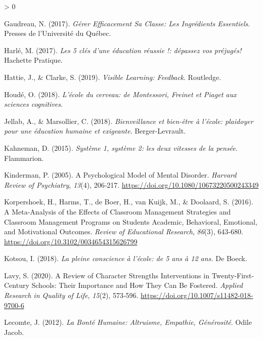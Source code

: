 \documentclass[
  french,
]{article}
\newlength{\cslhangindent}
\newenvironment{CSLReferences}[2] %
 {%
  \setlength{\parindent}{0pt}
  \ifodd #1 \everypar{\setlength{\hangindent}{\cslhangindent}}\ignorespaces\fi
  \ifnum #2 > 0
  \setlength{\parskip}{#2\baselineskip}
  \fi
 }%
 {}
\begin{document}
\begin{CSLReferences}{1}{0}
\leavevmode\hypertarget{ref-gaudreau2017}{}%
Gaudreau, N. (2017). \emph{Gérer Efficacement Sa Classe: Les Ingrédients Essentiels}. {Presses de l'Université du Québec}.

\leavevmode\hypertarget{ref-harle2017}{}%
Harlé, M. (2017). \emph{{Les 5 clés d'une éducation réussie !: dépassez vos préjugés!}} {Hachette Pratique}.

\leavevmode\hypertarget{ref-hattie2019}{}%
Hattie, J., \& Clarke, S. (2019). \emph{Visible Learning: Feedback}. {Routledge}.

\leavevmode\hypertarget{ref-houde2018a}{}%
Houdé, O. (2018). \emph{{L'école du cerveau: de Montessori, Freinet et Piaget aux sciences cognitives}}.

\leavevmode\hypertarget{ref-jellab2018}{}%
Jellab, A., \& Marsollier, C. (2018). \emph{{Bienveillance et bien-être à l'école: plaidoyer pour une éducation humaine et exigeante}}. {Berger-Levrault}.

\leavevmode\hypertarget{ref-kahneman2015}{}%
Kahneman, D. (2015). \emph{{Système 1, système 2: les deux vitesses de la pensée}}. {Flammarion}.

\leavevmode\hypertarget{ref-kinderman2005}{}%
Kinderman, P. (2005). A Psychological Model of Mental Disorder. \emph{Harvard Review of Psychiatry}, \emph{13}(4), 206‑217. \url{https://doi.org/10.1080/10673220500243349}

\leavevmode\hypertarget{ref-korpershoek2016}{}%
Korpershoek, H., Harms, T., de Boer, H., van Kuijk, M., \& Doolaard, S. (2016). A {Meta}-{Analysis} of the {Effects} of {Classroom Management Strategies} and {Classroom Management Programs} on {Students Academic}, {Behavioral}, {Emotional}, and {Motivational Outcomes}. \emph{Review of Educational Research}, \emph{86}(3), 643‑680. \url{https://doi.org/10.3102/0034654315626799}

\leavevmode\hypertarget{ref-kotsou2018}{}%
Kotsou, I. (2018). \emph{{La pleine conscience à l'école: de 5 ans à 12 ans.}} {De Boeck}.

\leavevmode\hypertarget{ref-lavy2020}{}%
Lavy, S. (2020). A {Review} of {Character Strengths Interventions} in {Twenty}-{First}-{Century Schools}: Their {Importance} and {How} They Can Be {Fostered}. \emph{Applied Research in Quality of Life}, \emph{15}(2), 573‑596. \url{https://doi.org/10.1007/s11482-018-9700-6}

\leavevmode\hypertarget{ref-lecomte2012c}{}%
Lecomte, J. (2012). \emph{La Bonté Humaine: {Altruisme}, Empathie, Générosité}. {Odile Jacob}.


\end{CSLReferences}
\end{document}
